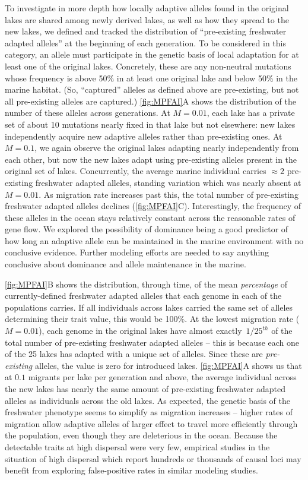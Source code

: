 \documentclass{article}
\begin{document}
To investigate in more depth how locally adaptive alleles found in the original lakes are shared among newly derived lakes, as well as how they spread to the new lakes, we defined and tracked the distribution of ``pre-existing freshwater adapted alleles'' at the beginning of each generation. 
To be considered in this category, an allele must participate in the genetic basis of local adaptation for at least one of the original lakes. 
Concretely, these are any non-neutral mutations whose frequency is above 50\% in at least one original lake and below 50\% in the marine habitat. 
(So, ``captured'' alleles as defined above are pre-existing, but not all pre-existing alleles are captured.)
\autoref{fig:MPFAI}A shows the distribution of the number of these alleles across generations. At $M = 0.01$, each lake has a private set of about 10 mutations nearly fixed in that lake but not elsewhere: new lakes independently acquire new adaptive alleles rather than pre-existing ones. 
At $M = 0.1$, we again observe the original lakes adapting nearly independently from each other, but now the new lakes adapt using pre-existing alleles present in the original set of lakes. 
Concurrently, the average marine individual carries $\approx 2$ pre-existing freshwater adapted alleles, standing variation which was nearly absent at $M=0.01$. As migration rate increases past this, the total number of pre-existing freshwater adapted alleles declines (\autoref{fig:MPFAI}C). Interestingly, the frequency of these alleles in the ocean
stays relatively constant across the reasonable rates of gene flow.
We explored the possibility of dominance being a good predictor of how long an adaptive allele can be maintained in the 
marine environment with no conclusive evidence. 
Further modeling efforts are needed to say anything conclusive about dominance and allele maintenance in the marine.

\autoref{fig:MPFAI}B shows the distribution, through time, of the mean \emph{percentage} of currently-defined freshwater adapted alleles that each genome in each of the populations carries. 
If all individuals across lakes carried the same set of alleles determining their trait value, this would be 100\%. At the lowest migration rate ($M = 0.01$), each genome in the original lakes have almost exactly~$1/25^{th}$ of the total number of pre-existing freshwater adapted alleles -- this is because each one of the 25 lakes has adapted with a unique set of alleles. 
Since these are \emph{pre-existing} alleles, the value is zero for introduced lakes. 
\autoref{fig:MPFAI}A shows us that at $0.1$ migrants per lake per generation and above, the average individual across the new lakes has nearly the same amount of pre-existing freshwater adapted alleles as individuals across the old lakes. 
As expected, the genetic basis of the freshwater phenotype seems to simplify as migration increases -- higher rates of migration allow adaptive alleles of larger effect to travel more efficiently through the population, even though they are deleterious in the ocean. 
Because the detectable traits at high dispersal were very few, empirical studies in the situation of high dispersal which report hundreds or thousands of causal loci may benefit from exploring false-positive rates in similar modeling studies.
\end{document}
